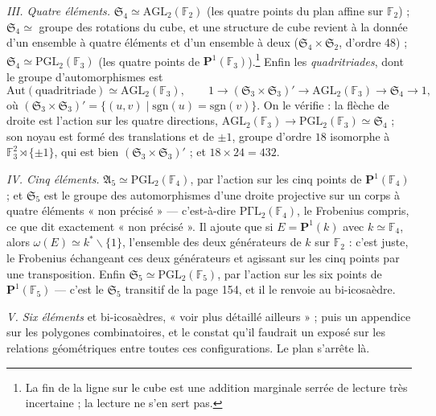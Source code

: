 \documentclass[11pt,a4paper]{article}
\begin{document}
\emph{III. Quatre éléments.} $\mathfrak{S}_4 \simeq
\mathrm{AGL}_2(\mathbb{F}_2)$ (les quatre points du plan affine sur
$\mathbb{F}_2$) ; $\mathfrak{S}_4 \simeq$ groupe des rotations du cube, et une
structure de cube revient à la donnée d'un ensemble à quatre éléments et d'un
ensemble à deux ($\mathfrak{S}_4 \times \mathfrak{S}_2$, d'ordre 48) ;
$\mathfrak{S}_4 \simeq \mathrm{PGL}_2(\mathbb{F}_3)$ (les quatre points de
$\mathbf{P}^1(\mathbb{F}_3)$).\footnote{La fin de la ligne sur le cube est une
addition marginale serrée de lecture très incertaine ; la lecture ne s'en
sert pas.} Enfin les \emph{quadritriades}, dont le groupe d'automorphismes
est
\[
  \mathrm{Aut}(\text{quadritriade}) \simeq \mathrm{AGL}_2(\mathbb{F}_3),
  \qquad
  1 \to (\mathfrak{S}_3 \times \mathfrak{S}_3)' \to \mathrm{AGL}_2(\mathbb{F}_3)
  \to \mathfrak{S}_4 \to 1,
\]
où $(\mathfrak{S}_3 \times \mathfrak{S}_3)' = \{ (u, v) \mid
\mathrm{sgn}(u) = \mathrm{sgn}(v) \}$. On le vérifie : la flèche de droite est
l'action sur les quatre directions, $\mathrm{AGL}_2(\mathbb{F}_3) \to
\mathrm{PGL}_2(\mathbb{F}_3) \simeq \mathfrak{S}_4$ ; son noyau est formé des
translations et de $\pm 1$, groupe d'ordre $18$ isomorphe à
$\mathbb{F}_3^2 \rtimes \{\pm 1\}$, qui est bien $(\mathfrak{S}_3 \times
\mathfrak{S}_3)'$ ; et $18 \times 24 = 432$.

\emph{IV. Cinq éléments.} $\mathfrak{A}_5 \simeq
\mathrm{PGL}_2(\mathbb{F}_4)$, par l'action sur les cinq points de
$\mathbf{P}^1(\mathbb{F}_4)$ ; et $\mathfrak{S}_5$ est le groupe des
automorphismes d'une droite projective sur un corps à quatre éléments « non
précisé » — c'est-à-dire $\mathrm{P\Gamma L}_2(\mathbb{F}_4)$, le Frobenius
compris, ce que dit exactement « non précisé ». Il ajoute que si $E =
\mathbf{P}^1(k)$ avec $k \simeq \mathbb{F}_4$, alors $\omega(E) \simeq k^{*}
\smallsetminus \{1\}$, l'ensemble des deux générateurs de $k$ sur
$\mathbb{F}_2$ : c'est juste, le Frobenius échangeant ces deux générateurs et
agissant sur les cinq points par une transposition. Enfin $\mathfrak{S}_5
\simeq \mathrm{PGL}_2(\mathbb{F}_5)$, par l'action sur les six points de
$\mathbf{P}^1(\mathbb{F}_5)$ — c'est le $\mathfrak{S}_5$ transitif de la page
154, et il le renvoie au bi-icosaèdre.

\emph{V. Six éléments} et bi-icosaèdres, « voir plus détaillé ailleurs » ; puis
un appendice sur les polygones combinatoires, et le constat qu'il faudrait un
exposé sur les relations géométriques entre toutes ces configurations. Le
plan s'arrête là.

\end{document}

